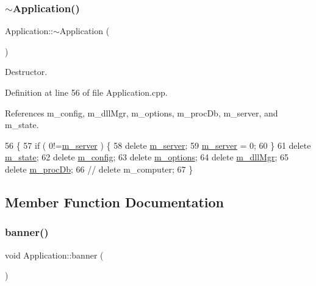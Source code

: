 \subsubsection{\texorpdfstring{$\sim$\+Application()}{~Application()}}
{\footnotesize\ttfamily Application\+::$\sim$\+Application (\begin{DoxyParamCaption}{ }\end{DoxyParamCaption})\hspace{0.3cm}{\ttfamily [virtual]}}



Destructor. 



Definition at line 56 of file Application.\+cpp.



References m\+\_\+config, m\+\_\+dll\+Mgr, m\+\_\+options, m\+\_\+proc\+Db, m\+\_\+server, and m\+\_\+state.


\begin{DoxyCode}
56                           \{
57   \textcolor{keywordflow}{if} (  0!=\hyperlink{classApplication_a5e6085b0f322d5036177b16113a75b56}{m\_server} ) \{
58     \textcolor{keyword}{delete} \hyperlink{classApplication_a5e6085b0f322d5036177b16113a75b56}{m\_server};
59     \hyperlink{classApplication_a5e6085b0f322d5036177b16113a75b56}{m\_server} = 0;
60   \}
61   \textcolor{keyword}{delete} \hyperlink{classApplication_a0ef9832e2d286716e597a1ff21ffcab4}{m\_state};
62   \textcolor{keyword}{delete} \hyperlink{classApplication_ae05f3e253ea871a194c3d30fd1d3b0c3}{m\_config};
63   \textcolor{keyword}{delete} \hyperlink{classApplication_a3b0c74bf1ba99a5042990e3fefaa8963}{m\_options};
64   \textcolor{keyword}{delete} \hyperlink{classApplication_a66b06cbeb824fe00ecd11499fcf01c55}{m\_dllMgr};
65   \textcolor{keyword}{delete} \hyperlink{classApplication_af030cefeb69586f01e965606d5dd8919}{m\_procDb};
66   \textcolor{comment}{//  delete m\_computer;}
67 \}
\end{DoxyCode}


\subsection{Member Function Documentation}
\mbox{\label{classApplication_af168aa3579262d65adc0bd4531361a53}} 
\subsubsection{\texorpdfstring{banner()}{banner()}}
{\footnotesize\ttfamily void Application\+::banner (\begin{DoxyParamCaption}{ }\end{DoxyParamCaption})}

